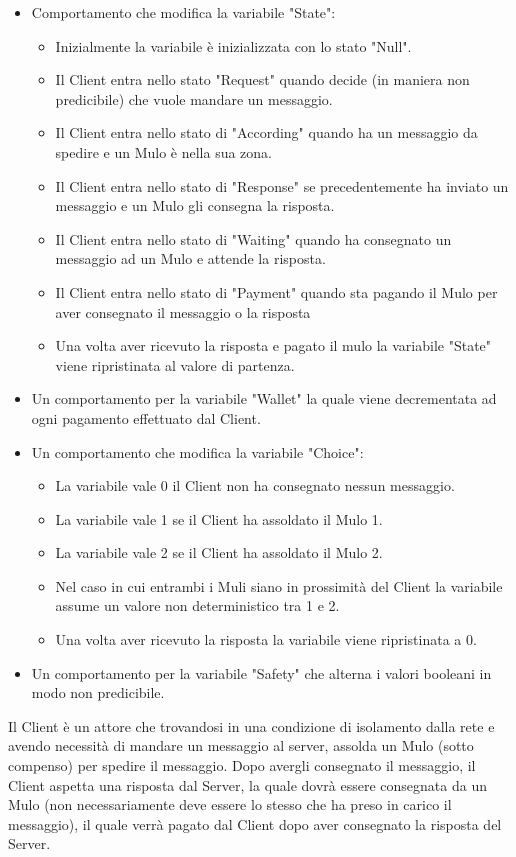 \documentclass[13pt,a4paper]{article}
\begin{document}
\begin{itemize}
\begin{itemize}
		\item Comportamento che modifica la variabile "State":
		\begin{itemize}
			\item Inizialmente la variabile è inizializzata con lo stato "Null".
			\item Il Client entra nello stato "Request" quando decide (in maniera non predicibile) che vuole mandare un messaggio.
			\item Il Client entra nello stato di "According" quando ha un messaggio da spedire e un Mulo è nella sua zona.
			\item Il Client entra nello stato di "Response" se precedentemente ha inviato un messaggio e  un Mulo  gli consegna la risposta.
			\item Il Client entra nello stato di "Waiting" quando ha consegnato un messaggio ad un Mulo e attende la risposta. 
			\item Il Client entra nello stato di "Payment" quando sta pagando il Mulo per aver consegnato il messaggio o la risposta
			\item Una volta aver ricevuto la risposta e pagato il mulo la variabile "State" viene ripristinata al valore di partenza.
		\end{itemize}
		\item Un comportamento per la variabile "Wallet" la quale viene decrementata ad ogni pagamento effettuato dal Client.
		\item Un comportamento che modifica la variabile "Choice":
		\begin{itemize}
			\item La variabile vale 0 il Client non ha consegnato nessun messaggio.
			\item La variabile vale 1 se  il Client ha assoldato il Mulo 1.
			\item La variabile vale 2 se  il Client ha assoldato il Mulo 2.
			\item Nel caso in cui entrambi i Muli siano in prossimità del Client la variabile assume un valore non deterministico tra 1 e 2.
			\item Una volta aver ricevuto la risposta la variabile viene ripristinata a 0.
		\end{itemize}
	\item Un comportamento per la variabile "Safety" che alterna i valori  booleani in modo non predicibile.
	\end{itemize}
	Il Client  è un attore che trovandosi in una condizione di isolamento dalla rete e avendo necessità di mandare un messaggio al server, assolda un Mulo (sotto compenso) per spedire il messaggio. Dopo avergli consegnato il messaggio, il Client aspetta una risposta dal Server, la quale dovrà essere consegnata da un Mulo (non necessariamente deve essere lo stesso che ha preso in carico il messaggio), il quale verrà pagato dal Client dopo aver consegnato la risposta del Server.
	

\end{itemize}
\end{document}
